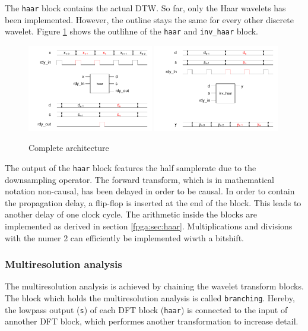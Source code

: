 \begin{refsection}
The \texttt{haar} block contains the actual DTW.
So far, only the Haar wavelets has been implemented.
However, the outline stays the same for every other discrete wavelet.
Figure \ref{fpga:fig:haar} shows the outlihne of the \texttt{haar} and \texttt{inv\_haar} block.
\begin{figure}
	\centering
	\includegraphics[width=0.49\textwidth]{papers/fpga/images/haar.pdf} %
	\includegraphics[width=0.49\textwidth]{papers/fpga/images/inv_haar.pdf}
	\caption{Complete architecture \label{fpga:fig:haar}}
\end{figure}
The output of the \texttt{haar} block features the half samplerate due to the downsampling operator.
The forward transform, which is in mathematical notation non-causal, has been delayed in order to be causal.
In order to contain the propagation delay, a flip-flop is inserted at the end of the block.
This leads to another delay of one clock cycle.
The arithmetic inside the blocks are implemented as derived in section \ref{fpga:sec:haar}.
Multiplications and divisions with the numer 2 can efficiently be implemented wiwth a bitshift.

\subsubsection{Multiresolution analysis}

The multiresolution analysis is achieved by chaining the wavelet transform blocks.
The block which holds the multiresolution analysis is called \texttt{branching}.
Hereby, the lowpass output (\texttt{s}) of each DFT block (\texttt{haar}) is connected to the input of annother DFT block, which performes another transformation to increase detail. 


\end{refsection}
